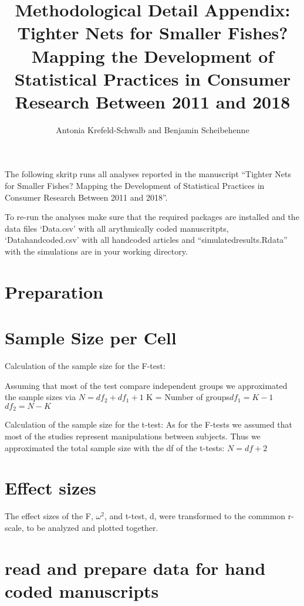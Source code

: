 \documentclass[
]{article}
\title{Methodological Detail Appendix: Tighter Nets for Smaller Fishes?
Mapping the Development of Statistical Practices in Consumer Research
Between 2011 and 2018}
\author{Antonia Krefeld-Schwalb and Benjamin Scheibehenne}
\date{}
\begin{document}
\maketitle

The following skritp runs all analyses reported in the manuscript
``Tighter Nets for Smaller Fishes? Mapping the Development of
Statistical Practices in Consumer Research Between 2011 and 2018''.

To re-run the analyses make sure that the required packages are
installed and the data files `Data.csv' with all arythmically coded
manuscritpts, `Datahandcoded.csv' with all handcoded articles and
``simulatedresults.Rdata'' with the simulations are in your working
directory.

\section{Preparation}

\section{Sample Size per Cell}

Calculation of the sample size for the F-test:

Assuming that most of the test compare independent groups we
approximated the sample sizes via \(N = df_2 + df_1 +1\) \newline K =
Number of groups\newline \(df_1 = K-1\) \newline \(df_2 = N-K\) \newline

Calculation of the sample size for the t-test: As for the F-tests we
assumed that most of the studies represent manipulations between
subjects. Thus we approximated the total sample size with the df of the
t-tests: \(N = df +2\)

\section{Effect sizes}

The effect sizes of the F, \(\omega^2\), and t-test, d, were transformed
to the commmon r-scale, to be analyzed and plotted together.

\section{read and prepare data for  hand coded manuscripts}
\end{document}
